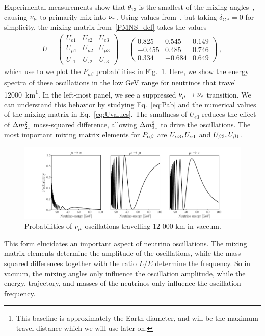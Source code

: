 Experimental measurements show that $\theta_{13}$ is the smallest of the mixing angles~\cite{nufit}, causing 
$\nu_\mu$ to primarily mix into $\nu_\tau$. Using values from~\cite{nufit}, but taking $\delta_\mathrm{CP} = 0$ for simplicity,
the mixing matrix from~\ref{PMNS_def} takes the values
\begin{align}\label{eq:Uvalues}
   U = \begin{pmatrix}
       U_{e 1} & U_{e2} & U_{e3} \\
       U_{\mu 1} & U_{\mu 2} & U_{\mu 3} \\
       U_{\tau 1} & U_{\tau 2} & U_{\tau 3}
   \end{pmatrix} 
   = \begin{pmatrix}
       0.825 & 0.545 & 0.149 \\
       -0.455 & 0.485 & 0.746 \\
       0.334 & -0.684 & 0.649
   \end{pmatrix} \,,
\end{align}
which use to we plot the $P_{\mu \beta}$ probabilities in Fig.~\ref{fig:vac_osc}. Here, we show the energy spectra of these oscillations in the low \si{\GeV} range for neutrinos that travel \SI{12000}{\km}\footnote{This baseline
is approximately the Earth diameter, and will be the maximum travel distance which we will use later on.}.
In the left-most panel, we see a suppressed $\nu_\mu \to \nu_e$ transition. We can understand this behavior by studying Eq.~\ref{eq:Pab} and the 
numerical values of the mixing matrix in Eq.~\ref{eq:Uvalues}.
The smallness of $U_{e3}$ reduces the effect of $\dm[21]$ mass-squared difference,
allowing $\dm[31]$ to drive the oscillations. 
The most important mixing matrix 
elements for $P_{\alpha\beta}$ are $U_{\alpha3}, U_{\alpha1}$ and $U_{\beta3}, U_{\beta1}$. %

\begin{figure}[!h]
    \begin{center}
    \includegraphics[width=1\textwidth]{figures/vac_osc.pdf}
    \caption{Probabilities of $\nu_\mu$ oscillations travelling 12 000 km in vaccum.}\label{fig:vac_osc}
    \end{center}
\end{figure}
This form elucidates an important aspect of neutrino oscillations. The mixing matrix elements
determine the amplitude of the oscillations, while the mass-squared differences together with the ratio $L/E$ determine the
frequency. So in vacuum, the mixing angles only influence the oscillation amplitude, while the energy, trajectory, and masses of
the neutrinos only influence the oscillation frequency.

